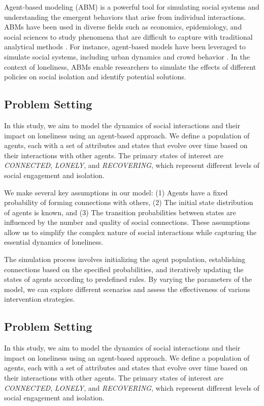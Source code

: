 \documentclass{article} %
\begin{document}
Agent-based modeling (ABM) is a powerful tool for simulating social systems and understanding the emergent behaviors that arise from individual interactions. ABMs have been used in diverse fields such as economics, epidemiology, and social sciences to study phenomena that are difficult to capture with traditional analytical methods \citep{poledna2023economic, west2023agent}. For instance, agent-based models have been leveraged to simulate social systems, including urban dynamics and crowd behavior \citep{Pour2021UrbanES}. In the context of loneliness, ABMs enable researchers to simulate the effects of different policies on social isolation and identify potential solutions.

\subsection{Problem Setting}
\label{sec:problem_setting}

In this study, we aim to model the dynamics of social interactions and their impact on loneliness using an agent-based approach. We define a population of agents, each with a set of attributes and states that evolve over time based on their interactions with other agents. The primary states of interest are \textit{CONNECTED}, \textit{LONELY}, and \textit{RECOVERING}, which represent different levels of social engagement and isolation.

We make several key assumptions in our model: (1) Agents have a fixed probability of forming connections with others, (2) The initial state distribution of agents is known, and (3) The transition probabilities between states are influenced by the number and quality of social connections. These assumptions allow us to simplify the complex nature of social interactions while capturing the essential dynamics of loneliness.

The simulation process involves initializing the agent population, establishing connections based on the specified probabilities, and iteratively updating the states of agents according to predefined rules. By varying the parameters of the model, we can explore different scenarios and assess the effectiveness of various intervention strategies.
\subsection{Problem Setting}
\label{sec:problem_setting}

In this study, we aim to model the dynamics of social interactions and their impact on loneliness using an agent-based approach. We define a population of agents, each with a set of attributes and states that evolve over time based on their interactions with other agents. The primary states of interest are \textit{CONNECTED}, \textit{LONELY}, and \textit{RECOVERING}, which represent different levels of social engagement and isolation.
\end{document}
